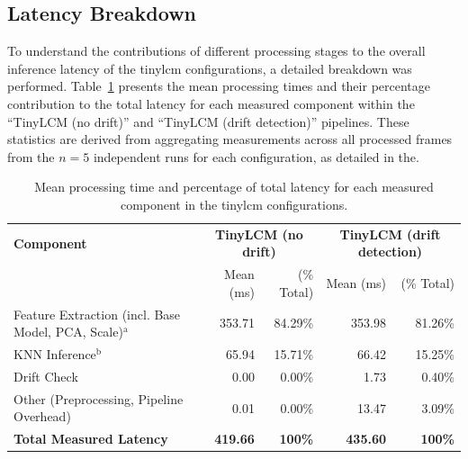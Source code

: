 \subsection{Latency Breakdown}
\label{ssec:phase1_latency_breakdown}

To understand the contributions of different processing stages to the overall inference latency of the \gls{tinylcm} configurations, a detailed breakdown was performed. Table~\ref{tab:latency_components_summary} presents the mean processing times and their percentage contribution to the total latency for each measured component within the ``TinyLCM (no drift)'' and ``TinyLCM (drift detection)'' pipelines. These statistics are derived from aggregating measurements across all processed frames from the $n=5$ independent runs for each configuration, as detailed in the.

\begin{table}[htbp]
    \centering
    \caption[Mean Processing Time of Latency Components for \gls{tinylcm} Configurations (Phase 1)]{Mean processing time and percentage of total latency for each measured component in the \gls{tinylcm} configurations.}
    \label{tab:latency_components_summary}
    \footnotesize
    \begin{tabularx}{\linewidth}{@{}X rr rr@{}} %
        \toprule
        \textbf{Component} & \multicolumn{2}{c}{\textbf{TinyLCM (no drift)}} & \multicolumn{2}{c}{\textbf{TinyLCM (drift detection)}} \\
        \cmidrule(lr){2-3} \cmidrule(lr){4-5} %
         & \multicolumn{1}{r}{Mean (\si{\milli\second})} & \multicolumn{1}{r}{(\% Total)} & \multicolumn{1}{r}{Mean (\si{\milli\second})} & \multicolumn{1}{r}{(\% Total)} \\
        \midrule
        Feature Extraction (incl. Base Model, PCA, Scale)$^{\text{a}}$ & 353.71 & 84.29\% & 353.98 & 81.26\% \\
        KNN Inference$^{\text{b}}$ & 65.94 & 15.71\% & 66.42 & 15.25\% \\
        Drift Check & 0.00 & 0.00\% & 1.73 & 0.40\% \\
        Other (Preprocessing, Pipeline Overhead) & 0.01 & 0.00\% & 13.47 & 3.09\% \\
        \midrule
        \textbf{Total Measured Latency} & \textbf{419.66} & \textbf{100\%} & \textbf{435.60} & \textbf{100\%} \\
        \bottomrule
    \end{tabularx}
\end{table}

